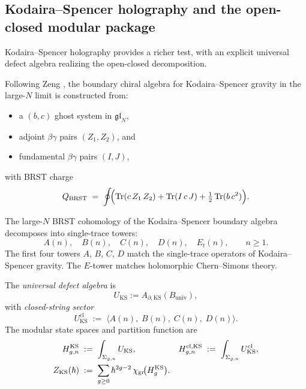\subsection{Kodaira--Spencer holography and the open-closed modular package}

Kodaira--Spencer holography provides a richer test, with an explicit universal defect
algebra realizing the open-closed decomposition.

\begin{definition}
Following Zeng \cite{Zeng23}, the boundary chiral algebra for Kodaira--Spencer gravity
in the large-$N$ limit is constructed from:
\begin{itemize}
\item a $(b,c)$ ghost system in $\mathfrak{gl}_N$,
\item adjoint $\beta\gamma$ pairs $(Z_1,Z_2)$, and
\item fundamental $\beta\gamma$ pairs $(I,J)$,
\end{itemize}
with BRST charge
\begin{equation}
Q_{\mathrm{BRST}}
\;=\;
\oint\!\Bigl(\operatorname{Tr}(c\,Z_1\,Z_2) + \operatorname{Tr}(I\,c\,J) + \tfrac{1}{2}\operatorname{Tr}(b\,c^2)\Bigr).
\end{equation}
\end{definition}

\begin{proposition}
The large-$N$ BRST cohomology of the Kodaira--Spencer boundary algebra decomposes into
single-trace towers:
\[
A(n),\quad B(n),\quad C(n),\quad D(n),\quad E_t(n),
\qquad n \geq 1.
\]
The first four towers $A$, $B$, $C$, $D$ match the single-trace operators of
Kodaira--Spencer gravity. The $E$-tower matches holomorphic Chern--Simons theory.
\end{proposition}

\begin{definition}
The \emph{universal defect algebra} is
\begin{equation}
U_{\mathrm{KS}} := A_{\partial,\mathrm{KS}}(B_{\mathrm{univ}}),
\end{equation}
with \emph{closed-string sector}
\[
U_{\mathrm{KS}}^{\mathrm{cl}}
\;:=\;
\bigl\langle A(n),\;B(n),\;C(n),\;D(n) \bigr\rangle.
\]
The modular state spaces and partition function are
\begin{align}
H_{g,n}^{\mathrm{KS}}
&\;:=\;
\int_{\Sigma_{g,n}} U_{\mathrm{KS}},
&
H_{g,n}^{\mathrm{cl,KS}}
&\;:=\;
\int_{\Sigma_{g,n}} U_{\mathrm{KS}}^{\mathrm{cl}},
\\
Z_{\mathrm{KS}}(\hbar)
&\;:=\;
\sum_{g \geq 0} \hbar^{2g-2}\,\chi_{\operatorname{gr}}\!\bigl(H_g^{\mathrm{KS}}\bigr).
\end{align}
\end{definition}


